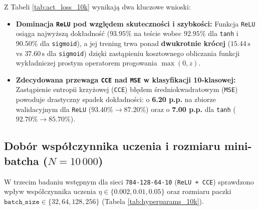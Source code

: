 \documentclass{article}
\begin{document}
Z Tabeli \ref{tab:act_loss_10k} wynikają dwa kluczowe wnioski:
\begin{itemize}
    \item \textbf{Dominacja \texttt{ReLU} pod względem skuteczności i szybkości:} Funkcja \texttt{ReLU} osiąga najwyższą dokładność ($93.95\%$ na teście wobec $92.95\%$ dla \texttt{tanh} i $90.50\%$ dla \texttt{sigmoid}), a jej trening trwa ponad \textbf{dwukrotnie krócej} ($15.44\,\text{s}$ vs $37.60\,\text{s}$ dla \texttt{sigmoid}) dzięki zastąpieniu kosztownego obliczania funkcji wykładniczej prostym operatorem progowania $\max(0, z)$.
    
    \item \textbf{Zdecydowana przewaga \texttt{CCE} nad \texttt{MSE} w klasyfikacji 10-klasowej:} Zastąpienie entropii krzyżowej (\texttt{CCE}) błędem średniokwadratowym (\texttt{MSE}) powoduje drastyczny spadek dokładności: o \textbf{6.20 p.p.} na zbiorze walidacyjnym dla \texttt{ReLU} ($93.40\% \to 87.20\%$) oraz o \textbf{7.00 p.p.} dla \texttt{tanh} ($92.70\% \to 85.70\%$). 
\end{itemize}

\subsection{Dobór współczynnika uczenia i rozmiaru mini-batcha ($N = 10\,000$)}

W trzecim badaniu wstępnym dla sieci \texttt{784-128-64-10} (\texttt{ReLU + CCE}) sprawdzono wpływ współczynnika uczenia $\eta \in \{0.002, 0.01, 0.05\}$ oraz rozmiaru paczki $\texttt{batch\_size} \in \{32, 64, 128, 256\}$ (Tabela \ref{tab:hyperparams_10k}).
\end{document}
